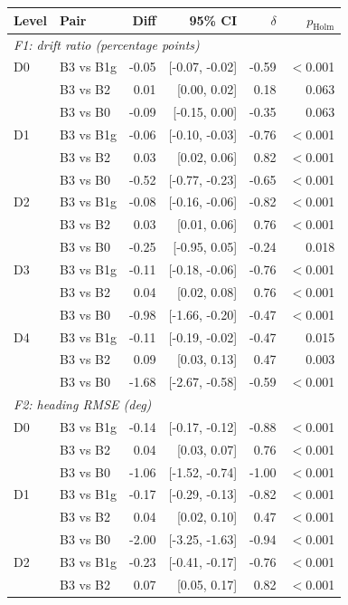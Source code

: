 \begin{tabular}{llrrrr}
\toprule
Level & Pair & Diff & 95\% CI & $\delta$ & $p_{\mathrm{Holm}}$ \\
\midrule
\multicolumn{6}{l}{\emph{F1: drift ratio (percentage points)}} \\
D0 & B3 vs B1g & -0.05 & [-0.07, -0.02] & -0.59 & $<$0.001 \\
 & B3 vs B2 & 0.01 & [0.00, 0.02] & 0.18 & 0.063 \\
 & B3 vs B0 & -0.09 & [-0.15, 0.00] & -0.35 & 0.063 \\
D1 & B3 vs B1g & -0.06 & [-0.10, -0.03] & -0.76 & $<$0.001 \\
 & B3 vs B2 & 0.03 & [0.02, 0.06] & 0.82 & $<$0.001 \\
 & B3 vs B0 & -0.52 & [-0.77, -0.23] & -0.65 & $<$0.001 \\
D2 & B3 vs B1g & -0.08 & [-0.16, -0.06] & -0.82 & $<$0.001 \\
 & B3 vs B2 & 0.03 & [0.01, 0.06] & 0.76 & $<$0.001 \\
 & B3 vs B0 & -0.25 & [-0.95, 0.05] & -0.24 & 0.018 \\
D3 & B3 vs B1g & -0.11 & [-0.18, -0.06] & -0.76 & $<$0.001 \\
 & B3 vs B2 & 0.04 & [0.02, 0.08] & 0.76 & $<$0.001 \\
 & B3 vs B0 & -0.98 & [-1.66, -0.20] & -0.47 & $<$0.001 \\
D4 & B3 vs B1g & -0.11 & [-0.19, -0.02] & -0.47 & 0.015 \\
 & B3 vs B2 & 0.09 & [0.03, 0.13] & 0.47 & 0.003 \\
 & B3 vs B0 & -1.68 & [-2.67, -0.58] & -0.59 & $<$0.001 \\
\midrule
\multicolumn{6}{l}{\emph{F2: heading RMSE (deg)}} \\
D0 & B3 vs B1g & -0.14 & [-0.17, -0.12] & -0.88 & $<$0.001 \\
 & B3 vs B2 & 0.04 & [0.03, 0.07] & 0.76 & $<$0.001 \\
 & B3 vs B0 & -1.06 & [-1.52, -0.74] & -1.00 & $<$0.001 \\
D1 & B3 vs B1g & -0.17 & [-0.29, -0.13] & -0.82 & $<$0.001 \\
 & B3 vs B2 & 0.04 & [0.02, 0.10] & 0.47 & $<$0.001 \\
 & B3 vs B0 & -2.00 & [-3.25, -1.63] & -0.94 & $<$0.001 \\
D2 & B3 vs B1g & -0.23 & [-0.41, -0.17] & -0.76 & $<$0.001 \\
 & B3 vs B2 & 0.07 & [0.05, 0.17] & 0.82 & $<$0.001 \\

\end{tabular}
